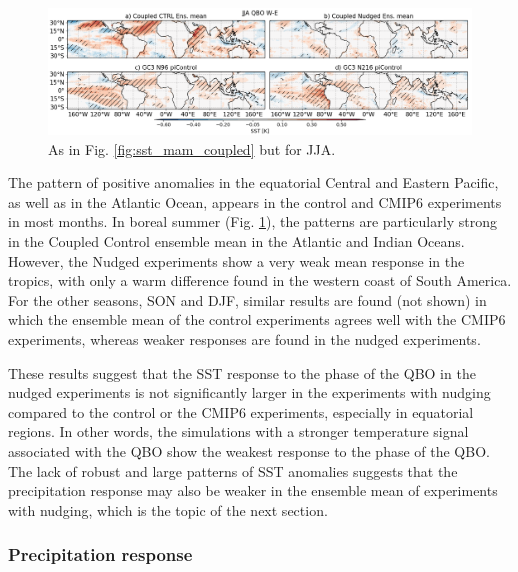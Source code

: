 \begin{figure}[t!]
\centering
 \includegraphics[width=\linewidth]{figures/sstseasonal_jjaqbowqboe.png}
\caption[SST response in JJA to the QBO in coupled nudged experiments]{As in Fig. \ref{fig:sst_mam_coupled} but for JJA.}
\label{fig:sst_jja_coupled}
\end{figure}

The pattern of positive anomalies in the equatorial Central and Eastern Pacific, as well as in the Atlantic Ocean, appears in the control and CMIP6 experiments in most months. 
In boreal summer (Fig. \ref{fig:sst_jja_coupled}), the patterns are particularly strong in the Coupled Control ensemble mean in the Atlantic and Indian Oceans. However, the Nudged experiments show a very weak mean response in the tropics, with only a warm difference found in the western coast of South America. 
For the other seasons, SON and DJF, similar results are found (not shown) in which the ensemble mean of the control experiments agrees well with the CMIP6 experiments, whereas weaker responses are found in the nudged experiments.

These results suggest that the SST response to the phase of the QBO in the nudged experiments is not significantly larger in the experiments with nudging compared to the control or the CMIP6 experiments, especially in equatorial regions. 
In other words, the simulations with a stronger temperature signal associated with the QBO show the  weakest response to the phase of the QBO.
The lack of robust and large patterns of SST anomalies suggests that the precipitation response may also be weaker in the ensemble mean of experiments with nudging, which is the topic of the next section.

\subsubsection{Precipitation response}

